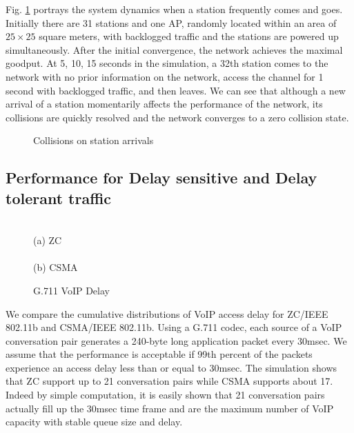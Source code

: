 \documentclass{acm_proc_article-sp}
\begin{document}
Fig. \ref{fig.delay} portrays the system dynamics when a station frequently comes and goes. Initially there are 31 stations and one AP, randomly located within an area of $25 \times 25$ square meters, with backlogged traffic and the stations are powered up simultaneously. After the initial convergence, the network achieves the maximal goodput. At 5, 10, 15 seconds in the simulation, a 32th station comes to the network with no prior information on the network, access the channel for 1 second with backlogged traffic, and then leaves. We can see that although a new arrival of a station momentarily affects the performance of the network, its collisions are quickly resolved and the network converges to a zero collision state.
\begin{figure}[ht]
    \begin{center}\small
{}\normalsize
    \caption{Collisions on station arrivals}\label{fig.delay}
    \end{center}
\vspace{-0.2in}
\end{figure}
\subsection{Performance for Delay sensitive and Delay tolerant traffic}
\label{s.voipdelaycapacity}
\begin{figure}[ht]
    \begin{center}\small
     \\ (a) ZC \\
    \\ (b) CSMA
    \normalsize
    \caption{G.711 VoIP Delay}\label{fig.voipdelay}
    \end{center}
\vspace{-0.2in}
\end{figure}
We compare the cumulative distributions of VoIP access delay for ZC/IEEE 802.11b and CSMA/IEEE 802.11b. Using a G.711 codec, each source of a VoIP conversation pair generates a 240-byte long application packet every 30msec. We assume that the performance is acceptable if 99th percent of the packets experience an access delay less than or equal to 30msec. The simulation shows that ZC support up to 21 conversation pairs while CSMA supports about 17.  Indeed by simple computation, it is easily shown that 21 conversation pairs actually fill up the 30msec time frame and are the maximum number of VoIP capacity with stable queue size and delay.
\end{document}
